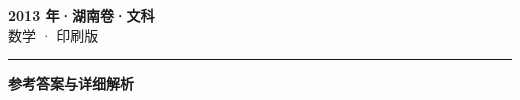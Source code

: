 \documentclass[zihao=5, a4paper]{ctexart}
\begin{document}
\begin{center}
  {\Large\bfseries 2013 年·湖南卷·文科}\\[4pt]
  {\large 数学 · 印刷版}
\end{center}
\medskip
{}

\par\bigskip\hrule\bigskip
{}
\Needspace{0.55\textheight}
\begin{center}{\large\bfseries 参考答案与详细解析}\end{center}
\smallskip

\end{document}

